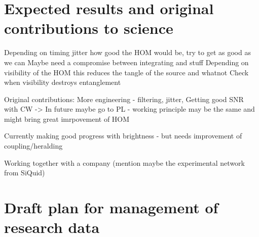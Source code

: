 \documentclass{article}
\theoremstyle{mytheoremstyle}
\theoremstyle{mytheoremstyle}
\theoremstyle{myproblemstyle}
\begin{document}
\section{Expected results and original contributions to science}
Depending on timing jitter how good the HOM would be, try to get as good as we can
Maybe need a compromise between integrating and stuff
Depending on visibility of the HOM this reduces the tangle of the source and whatnot
Check when visibility destroys entanglement

Original contributions: More engineering - filtering, jitter,
Getting good SNR with CW -> In future maybe go to PL - working principle may be the same and might bring great imrpovement of HOM

Currently making good progress with brightness - but needs improvement of coupling/heralding

Working together with a company (mention maybe the experimental network from SiQuid)

\section{Draft plan for management of research data}

\newpage


\end{document}
